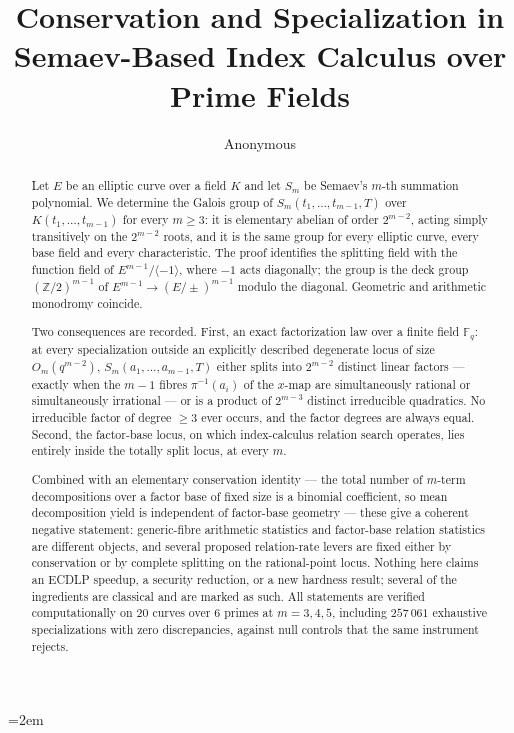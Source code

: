 \documentclass[11pt,a4paper]{article}
\title{Conservation and Specialization in \\ Semaev-Based Index Calculus over Prime Fields}
\author{Anonymous}
\date{}
\theoremstyle{plain}
\theoremstyle{definition}
\newcommand{\FF}{\mathbb{F}}
\newcommand{\ZZ}{\mathbb{Z}}
\newcommand{\Fq}{\FF_q}
\begin{document}
\maketitle
\emergencystretch=2em

\begin{abstract}
Let $E$ be an elliptic curve over a field $K$ and let $S_m$ be Semaev's $m$-th
summation polynomial. We determine the Galois group of $S_m(t_1,\dots,t_{m-1},T)$
over $K(t_1,\dots,t_{m-1})$ for every $m \ge 3$: it is elementary abelian of
order $2^{m-2}$, acting simply transitively on the $2^{m-2}$ roots, and it is
the same group for every elliptic curve, every base field and every
characteristic. The proof identifies the splitting field with the function field
of $E^{m-1}/\langle -1\rangle$, where $-1$ acts diagonally; the group is the
deck group $(\ZZ/2)^{m-1}$ of $E^{m-1} \to (E/{\pm})^{m-1}$ modulo the diagonal.
Geometric and arithmetic monodromy coincide.

Two consequences are recorded. First, an exact factorization law over a finite
field $\Fq$: at every specialization outside an explicitly described degenerate
locus of size $O_m(q^{m-2})$, $S_m(a_1,\dots,a_{m-1},T)$ either splits into
$2^{m-2}$ distinct linear factors --- exactly when the $m-1$ fibres
$\pi^{-1}(a_i)$ of the $x$-map are simultaneously rational or simultaneously
irrational --- or is a product of $2^{m-3}$ distinct irreducible quadratics. No
irreducible factor of degree $\ge 3$ ever occurs, and the factor degrees are
always equal. Second, the factor-base locus, on which index-calculus relation
search operates, lies entirely inside the totally split locus, at every $m$.

Combined with an elementary conservation identity --- the total number of
$m$-term decompositions over a factor base of fixed size is a binomial
coefficient, so mean decomposition yield is independent of factor-base geometry
--- these give a coherent negative statement: generic-fibre arithmetic statistics
and factor-base relation statistics are different objects, and several proposed
relation-rate levers are fixed either by conservation or by complete splitting on
the rational-point locus. Nothing here claims an ECDLP speedup, a security
reduction, or a new hardness result; several of the ingredients are classical and
are marked as such. All statements are verified computationally on $20$ curves
over $6$ primes at $m = 3, 4, 5$, including $257\,061$ exhaustive specializations
with zero discrepancies, against null controls that the same instrument rejects.
\end{abstract}
\end{document}
